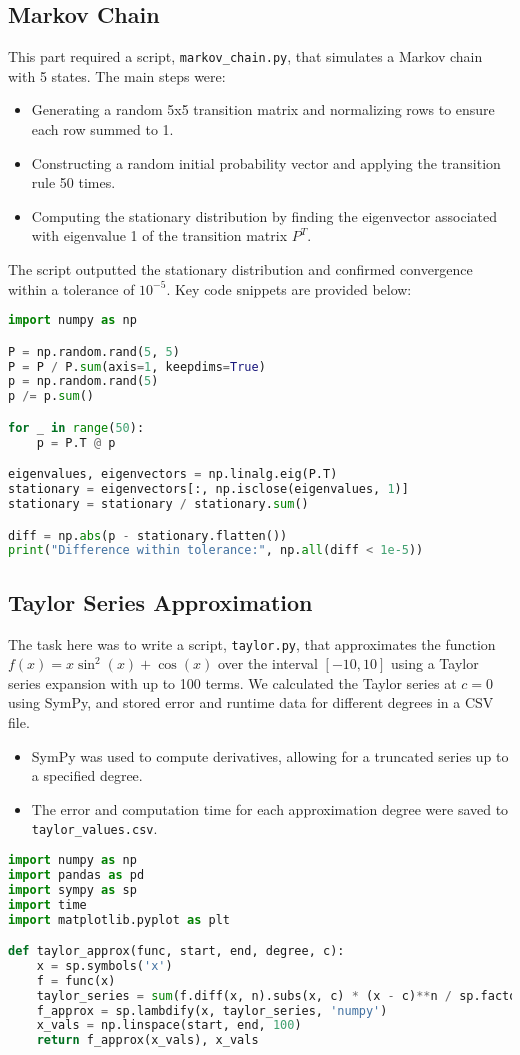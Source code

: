 \documentclass{article}
\begin{document}
\subsection{Markov Chain}
This part required a script, \texttt{markov\_chain.py}, that simulates a Markov chain with 5 states. The main steps were:
\begin{itemize}
    \item Generating a random 5x5 transition matrix and normalizing rows to ensure each row summed to 1.
    \item Constructing a random initial probability vector and applying the transition rule 50 times.
    \item Computing the stationary distribution by finding the eigenvector associated with eigenvalue 1 of the transition matrix \(P^T\).
\end{itemize}
The script outputted the stationary distribution and confirmed convergence within a tolerance of \(10^{-5}\). Key code snippets are provided below:
\begin{lstlisting}[language=Python]
import numpy as np

P = np.random.rand(5, 5)
P = P / P.sum(axis=1, keepdims=True)
p = np.random.rand(5)
p /= p.sum()

for _ in range(50):
    p = P.T @ p

eigenvalues, eigenvectors = np.linalg.eig(P.T)
stationary = eigenvectors[:, np.isclose(eigenvalues, 1)]
stationary = stationary / stationary.sum()

diff = np.abs(p - stationary.flatten())
print("Difference within tolerance:", np.all(diff < 1e-5))
\end{lstlisting}

\subsection{Taylor Series Approximation}
The task here was to write a script, \texttt{taylor.py}, that approximates the function \( f(x) = x \sin^2(x) + \cos(x) \) over the interval \([-10, 10]\) using a Taylor series expansion with up to 100 terms. We calculated the Taylor series at \( c = 0 \) using SymPy, and stored error and runtime data for different degrees in a CSV file.
\begin{itemize}
    \item SymPy was used to compute derivatives, allowing for a truncated series up to a specified degree.
    \item The error and computation time for each approximation degree were saved to \texttt{taylor\_values.csv}.
\end{itemize}
\begin{lstlisting}[language=Python]
import numpy as np
import pandas as pd
import sympy as sp
import time
import matplotlib.pyplot as plt

def taylor_approx(func, start, end, degree, c):
    x = sp.symbols('x')
    f = func(x)
    taylor_series = sum(f.diff(x, n).subs(x, c) * (x - c)**n / sp.factorial(n) for n in range(degree + 1))
    f_approx = sp.lambdify(x, taylor_series, 'numpy')
    x_vals = np.linspace(start, end, 100)
    return f_approx(x_vals), x_vals
\end{lstlisting}
\end{document}

